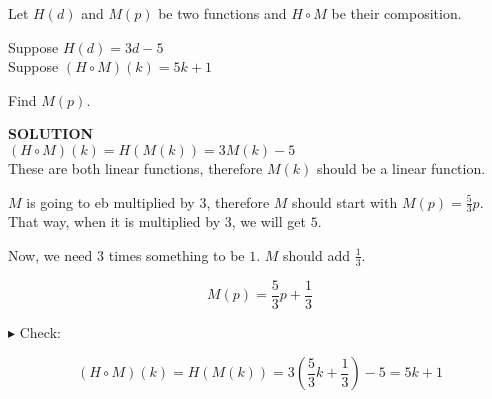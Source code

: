 \documentclass{ximera}
\begin{document}
\begin{example}


Let $H(d)$ and $M(p)$ be two functions and $H \circ M$ be their composition.


Suppose $H(d) = 3 d - 5$ \\

Suppose $(H \circ M)(k) = 5 k + 1$


Find $M(p)$.



\textbf{\textcolor{purple!50!blue!90!black}{SOLUTION}} \\




$(H \circ M)(k) = H(M(k)) = 3 M(k) - 5 $  \\




These are both linear functions, therefore $M(k)$ should be a linear function.


$M$ is going to eb multiplied by $3$, therefore $M$ should start with $M(p) = \frac{5}{3}p$. That way, when it is multiplied by $3$, we will get $5$.




Now, we need $3$ times something to be $1$.  $M$ should add $\frac{1}{3}$.

\[  M(p) =    \frac{5}{3} p +     \frac{1}{3} \]



$\blacktriangleright$ Check: 


\[    (H \circ M)(k) = H(M(k)) = 3 \left( \frac{5}{3} k + \frac{1}{3} \right) - 5 =    5 k + 1    \]

\end{example}
\end{document}
